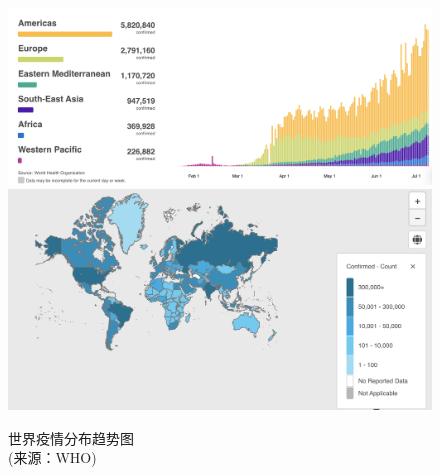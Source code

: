 \documentclass[
]{article}
\begin{document}
\begin{figure}[H]
\caption{世界疫情分布趋势图\\ \vspace{-3mm}(来源：WHO)} %
\centering
\includegraphics[]{./input/covid1.png} %
\includegraphics[]{./input/covid4.png}
\label{} %
\end{figure}
\end{document}
